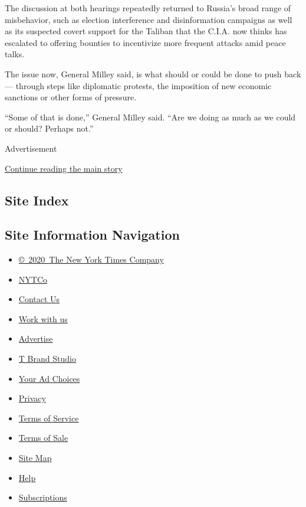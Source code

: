 The discussion at both hearings repeatedly returned to Russia's broad
range of misbehavior, such as election interference and disinformation
campaigns as well as its suspected covert support for the Taliban that
the C.I.A. now thinks has escalated to offering bounties to incentivize
more frequent attacks amid peace talks.

The issue now, General Milley said, is what should or could be done to
push back --- through steps like diplomatic protests, the imposition of
new economic sanctions or other forms of pressure.

``Some of that is done,'' General Milley said. ``Are we doing as much as
we could or should? Perhaps not.''

Advertisement

\protect\hyperlink{after-bottom}{Continue reading the main story}

\hypertarget{site-index}{%
\subsection{Site Index}\label{site-index}}

\hypertarget{site-information-navigation}{%
\subsection{Site Information
Navigation}\label{site-information-navigation}}

\begin{itemize}
\tightlist
\item
  \href{https://help.nytimes.com/hc/en-us/articles/115014792127-Copyright-notice}{©~2020~The
  New York Times Company}
\end{itemize}

\begin{itemize}
\tightlist
\item
  \href{https://www.nytco.com/}{NYTCo}
\item
  \href{https://help.nytimes.com/hc/en-us/articles/115015385887-Contact-Us}{Contact
  Us}
\item
  \href{https://www.nytco.com/careers/}{Work with us}
\item
  \href{https://nytmediakit.com/}{Advertise}
\item
  \href{http://www.tbrandstudio.com/}{T Brand Studio}
\item
  \href{https://www.nytimes.com/privacy/cookie-policy\#how-do-i-manage-trackers}{Your
  Ad Choices}
\item
  \href{https://www.nytimes.com/privacy}{Privacy}
\item
  \href{https://help.nytimes.com/hc/en-us/articles/115014893428-Terms-of-service}{Terms
  of Service}
\item
  \href{https://help.nytimes.com/hc/en-us/articles/115014893968-Terms-of-sale}{Terms
  of Sale}
\item
  \href{https://spiderbites.nytimes.com}{Site Map}
\item
  \href{https://help.nytimes.com/hc/en-us}{Help}
\item
  \href{https://www.nytimes.com/subscription?campaignId=37WXW}{Subscriptions}
\end{itemize}
